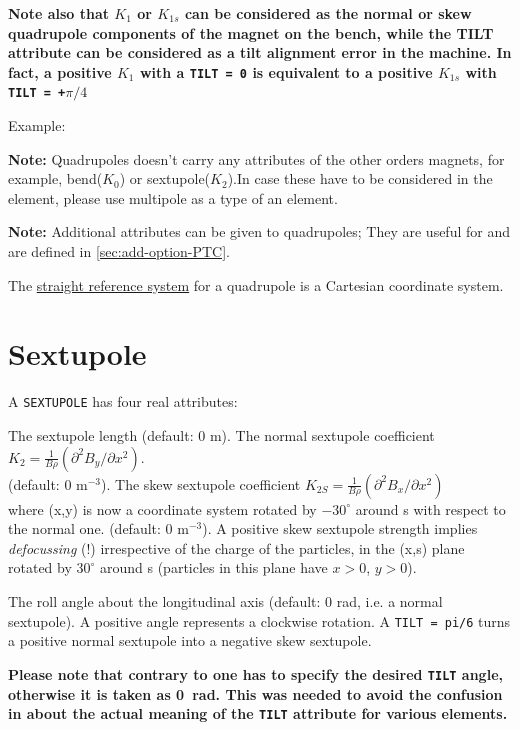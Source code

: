 \textbf{Note also that $K_1$ or $K_{1s}$ can be considered as
  the normal or skew quadrupole components of the magnet on
  the bench, while the TILT attribute can be considered as a
  tilt alignment error in the machine. In fact, a positive
  $K_1$ with a \texttt{TILT = 0} is equivalent to a positive $K_{1s}$
  with \texttt{TILT = +$\pi/4$ }}

Example:

\textbf{Note:} Quadrupoles doesn't carry any attributes of the other orders magnets,
 for example, bend($K_0$) or sextupole($K_2$).In case these have to be considered
 in the element, please use multipole as a type of an element.


\textbf{Note:} Additional attributes can be given to quadrupoles; They
are useful for \ptc and are defined in \ref{sec:add-option-PTC}.

The \hyperref[subsec:local-straight]{straight reference system} for
a quadrupole is a Cartesian coordinate system.


\section{Sextupole}
\label{sec:sextupole}


A \texttt{SEXTUPOLE} has four real attributes:
\begin{madlist}
     The sextupole length (default: 0 m).
     The normal sextupole coefficient $K_2 = \frac{1}{B \rho}
      (\partial^2 B_y / \partial x^2)$. \\
      (default: 0 m$^{-3}$).
     The skew sextupole coefficient
      $K_{2S} = \frac{1}{B \rho} (\partial^2 B_x / \partial x^2)$ \\
      where (x,y) is now a coordinate system rotated by $-30^\circ$ around s with
      respect to the normal one. (default: 0 m$^{-3}$). A positive skew
      sextupole strength implies \textsl{defocussing} (!)
      irrespective of the charge of the particles,
      in the (x,s) plane rotated by $30^\circ$ around s (particles in
      this plane have $x > 0$, $y > 0$).

     The roll angle about the longitudinal axis (default: 0
      rad, i.e. a normal sextupole). A positive angle represents a
      clockwise rotation. A \texttt{TILT = pi/6} turns a positive normal
      sextupole into a negative skew sextupole.

      \textbf{Please note that contrary to \madeight one has to specify the
        desired \texttt{TILT} angle, otherwise it is taken as
        0~rad. This was needed to avoid the confusion in \madeight about
        the actual meaning of the \texttt{TILT} attribute for various
        elements.}
\end{madlist}

